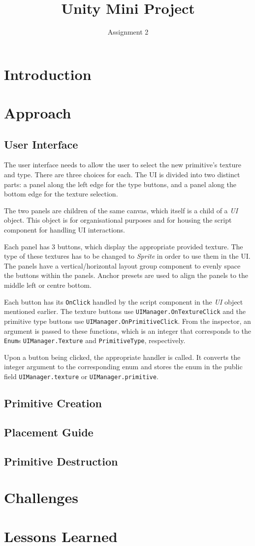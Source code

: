 \documentclass[a4paper, 12pt]{scrartcl}
\title{Unity Mini Project}
\subtitle{Assignment 2}
\date{}
\author{}
\begin{document}
\maketitle

\section{Introduction}

\section{Approach}
\subsection{User Interface}
The user interface needs to allow the user to select the new primitive's texture and type. There are three choices for each. The UI is divided into two distinct parts: a panel along the left edge for the type buttons, and a panel along the bottom edge for the texture selection.

The two panels are children of the same canvas, which itself is a child of a \textit{UI} object. This object is for organisational purposes and for housing the script component for handling UI interactions.

Each panel has 3 buttons, which display the appropriate provided texture. The type of these textures has to be changed to \textit{Sprite} in order to use them in the UI. The panels have a vertical/horizontal layout group component to evenly space the buttons within the panels. Anchor presets are used to align the panels to the middle left or centre bottom.

Each button has its \texttt{OnClick} handled by the script component in the \textit{UI} object mentioned earlier. The texture buttons use \texttt{UIManager.OnTextureClick} and the primitive type buttons use \texttt{UIManager.OnPrimitiveClick}. From the inspector, an argument is passed to these functions, which is an integer that corresponds to the \texttt{Enum}s \texttt{UIManager.Texture} and \texttt{PrimitiveType}, respectively.

Upon a button being clicked, the appropriate handler is called. It converts the integer argument to the corresponding enum and stores the enum in the public field \texttt{UIManager.texture} or \texttt{UIManager.primitive}.

\subsection{Primitive Creation}

\subsection{Placement Guide}

\subsection{Primitive Destruction}

\section{Challenges}

\section{Lessons Learned}
\end{document}
